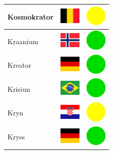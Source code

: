 \documentclass[12pt, a4paper, twoside]{report}
\begin{document}
\begin{center}
\begin{longtable}{|p{5cm}|p{2cm}|p{2cm}|}
 Kosmokrator                                                & \includegraphics[width=1cm]{../img/flags/be} &   \includegraphics[width=1cm]{../likes/m} \\ \hline
 Kraanium                                                   & \includegraphics[width=1cm]{../img/flags/no} &   \includegraphics[width=1cm]{../likes/y} \\ \hline
 Kreator                                                    & \includegraphics[width=1cm]{../img/flags/de} &   \includegraphics[width=1cm]{../likes/y} \\ \hline
 Krisiun                                                    & \includegraphics[width=1cm]{../img/flags/br} &   \includegraphics[width=1cm]{../likes/y} \\ \hline
 Kryn                                                       & \includegraphics[width=1cm]{../img/flags/hr} &   \includegraphics[width=1cm]{../likes/m} \\ \hline
 Kryss                                                      & \includegraphics[width=1cm]{../img/flags/de} &   \includegraphics[width=1cm]{../likes/y} \\ \hline

\end{longtable}
\end{center}
\end{document}

